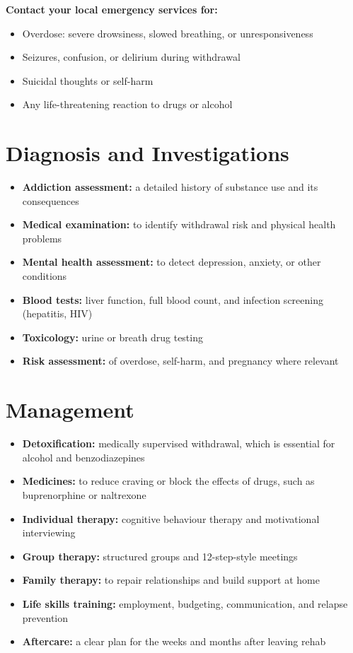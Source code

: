 \textbf{Contact your local emergency services for:}
\begin{itemize}
    \item Overdose: severe drowsiness, slowed breathing, or unresponsiveness
    \item Seizures, confusion, or delirium during withdrawal
    \item Suicidal thoughts or self-harm
    \item Any life-threatening reaction to drugs or alcohol
\end{itemize}

\section*{Diagnosis and Investigations}
\begin{itemize}
    \item \textbf{Addiction assessment:} a detailed history of substance use and its consequences
    \item \textbf{Medical examination:} to identify withdrawal risk and physical health problems
    \item \textbf{Mental health assessment:} to detect depression, anxiety, or other conditions
    \item \textbf{Blood tests:} liver function, full blood count, and infection screening (hepatitis, HIV)
    \item \textbf{Toxicology:} urine or breath drug testing
    \item \textbf{Risk assessment:} of overdose, self-harm, and pregnancy where relevant
\end{itemize}

\section*{Management}
\begin{itemize}
    \item \textbf{Detoxification:} medically supervised withdrawal, which is essential for alcohol and benzodiazepines
    \item \textbf{Medicines:} to reduce craving or block the effects of drugs, such as buprenorphine or naltrexone
    \item \textbf{Individual therapy:} cognitive behaviour therapy and motivational interviewing
    \item \textbf{Group therapy:} structured groups and 12-step-style meetings
    \item \textbf{Family therapy:} to repair relationships and build support at home
    \item \textbf{Life skills training:} employment, budgeting, communication, and relapse prevention
    \item \textbf{Aftercare:} a clear plan for the weeks and months after leaving rehab
\end{itemize}

